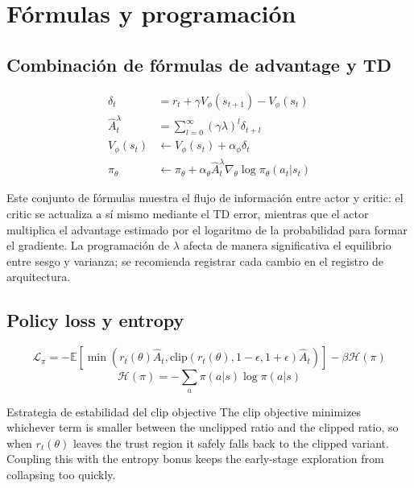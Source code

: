 \section{Fórmulas y programación}

\subsection{Combinación de fórmulas de advantage y TD}

\begin{align*}
\delta_t &= r_t + \gamma V_{\phi}(s_{t+1}) - V_{\phi}(s_t) \\
\hat{A}_t^{\lambda} &= \sum_{l=0}^{\infty} (\gamma \lambda)^l \delta_{t+l} \\
V_{\phi}(s_t) &\leftarrow V_{\phi}(s_t) + \alpha_\phi \delta_t \\
\pi_\theta &\leftarrow \pi_\theta + \alpha_\theta \hat{A}_t^{\lambda} \nabla_\theta \log \pi_\theta(a_t|s_t)
\end{align*}

Este conjunto de fórmulas muestra el flujo de información entre actor y critic: el critic se actualiza a sí mismo mediante el TD error, mientras que el actor multiplica el advantage estimado por el logaritmo de la probabilidad para formar el gradiente. La programación de $\lambda$ afecta de manera significativa el equilibrio entre sesgo y varianza; se recomienda registrar cada cambio en el registro de arquitectura.

\subsection{Policy loss y entropy}

\begin{equation*}
\mathcal{L}_\pi = -\mathbb{E} \left[ \min\left( r_t(\theta) \hat{A}_t, \text{clip}(r_t(\theta), 1-\epsilon, 1+\epsilon)\hat{A}_t \right) \right] - \beta \mathcal{H}(\pi)
\end{equation*}
\begin{equation*}
\mathcal{H}(\pi) = -\sum_a \pi(a|s) \log \pi(a|s)
\end{equation*}

\begin{knowledgebox}{Estrategia de estabilidad del clip objective}
The clip objective minimizes whichever term is smaller between the unclipped ratio and the clipped ratio, so when $r_t(\theta)$ leaves the trust region it safely falls back to the clipped variant. Coupling this with the entropy bonus keeps the early-stage exploration from collapsing too quickly.
\end{knowledgebox}

